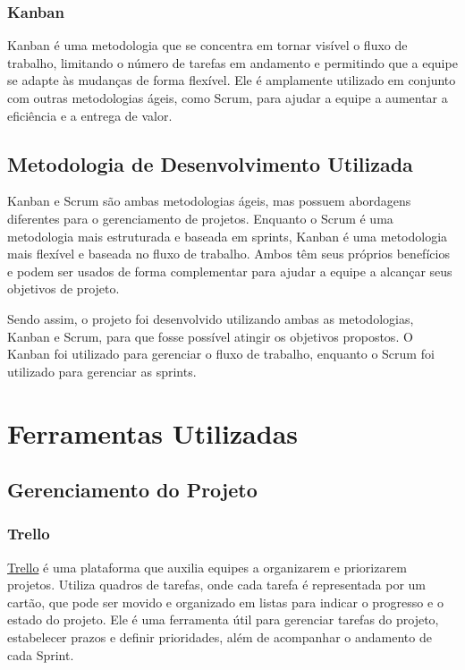 \subsubsection{Kanban}

Kanban é uma metodologia que se concentra em tornar visível o fluxo de trabalho, limitando o número de tarefas em andamento e permitindo que a equipe se adapte às mudanças de forma flexível. Ele é amplamente utilizado em conjunto com outras metodologias ágeis, como Scrum, para ajudar a equipe a aumentar a eficiência e a entrega de valor. \cite{Lage2008}

\subsection{Metodologia de Desenvolvimento Utilizada}

Kanban e Scrum são ambas metodologias ágeis, mas possuem abordagens diferentes para o gerenciamento de projetos. Enquanto o Scrum é uma metodologia mais estruturada e baseada em sprints, Kanban é uma metodologia mais flexível e baseada no fluxo de trabalho. Ambos têm seus próprios benefícios e podem ser usados de forma complementar para ajudar a equipe a alcançar seus objetivos de projeto. \cite{Kniberg2010}

Sendo assim, o projeto foi desenvolvido utilizando ambas as metodologias, Kanban e Scrum, para que fosse possível atingir os objetivos propostos. O Kanban foi utilizado para gerenciar o fluxo de trabalho, enquanto o Scrum foi utilizado para gerenciar as sprints.

\section{Ferramentas Utilizadas}

\subsection{Gerenciamento do Projeto}

\subsubsection{Trello}

\href{https://trello.com/}{Trello} é uma plataforma que auxilia equipes a organizarem e priorizarem projetos. Utiliza quadros de tarefas, onde cada tarefa é representada por um cartão, que pode ser movido e organizado em listas para indicar o progresso e o estado do projeto. Ele é uma ferramenta útil para gerenciar tarefas do projeto, estabelecer prazos e definir prioridades, além de acompanhar o andamento de cada Sprint.

